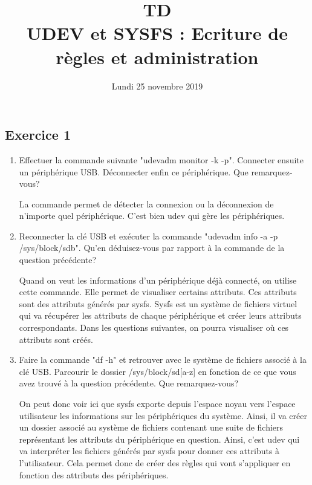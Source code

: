 \documentclass[11pt]{article}
\title{\huge{\textbf TD \\UDEV et SYSFS : Ecriture de règles et administration}}
\date{Lundi 25 novembre 2019}
\begin{document}
\maketitle

\subsection*{Exercice 1}

\begin{enumerate}
	\item Effectuer la commande suivante "udevadm monitor -k -p". Connecter ensuite un périphérique USB. Déconnecter enfin ce périphérique. Que remarquez-vous? 
	
	 \bigskip 
	
	La commande permet de détecter la connexion ou la déconnexion de n'importe quel périphérique. C'est bien udev qui gère les périphériques.\bigskip
	
	\item Reconnecter la clé USB et exécuter la commande "udevadm info -a -p /sys/block/sdb". Qu'en déduisez-vous par rapport à la commande de la question précédente? 
	
	 \bigskip
	
	Quand on veut les informations d'un périphérique déjà connecté, on utilise cette commande. Elle permet de visualiser certains attributs. 
	Ces attributs sont des attributs générés par sysfs. Sysfs est un système de fichiers virtuel qui va récupérer les attributs de chaque périphérique et créer leurs 
	attributs correspondants. Dans les questions suivantes, on pourra visualiser où ces attributs sont créés.
	
	\item Faire la commande "df -h" et retrouver avec le système de fichiers associé à la clé USB. 
	Parcourir le dossier /sys/block/sd[a-z] en fonction de ce que vous avez trouvé à la question précédente. Que remarquez-vous?
	
	 \bigskip
	
	 \bigskip
	
	On peut donc voir ici que sysfs exporte depuis l'espace noyau vers l'espace utilisateur les informations 
	sur les périphériques du système. Ainsi, il va créer un dossier associé au système de fichiers contenant une 
	suite de fichiers représentant les attributs du périphérique en question. Ainsi, c'est udev qui va 
	interpréter les fichiers générés par sysfs pour donner ces attributs à l'utilisateur. Cela permet donc 
	de créer des règles qui vont s'appliquer en fonction des attributs des périphériques. \newpage
	

\end{enumerate}
\end{document}
